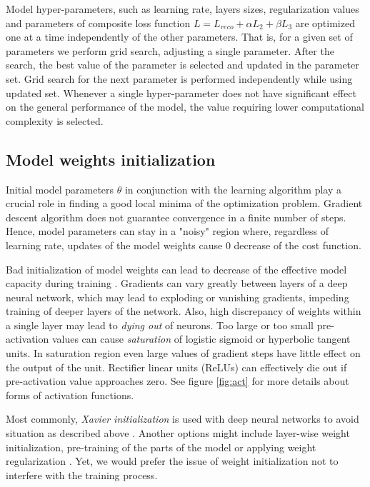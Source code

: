 Model hyper-parameters, such as learning rate, layers sizes, regularization values and parameters of composite loss function $L=L_{reco} + \alpha L_2 + \beta L_3$ are optimized one at a time independently of the other parameters.
That is, for a given set of parameters we perform grid search, adjusting a single parameter.
After the search, the best value of the parameter is selected and updated in the parameter set.
Grid search for the next parameter is performed independently while using updated set.
Whenever a single hyper-parameter does not have significant effect on the general performance of the model, the value requiring lower computational complexity is selected.

\subsection{Model weights initialization}

Initial model parameters $\theta$ in conjunction with the learning algorithm play a crucial role in finding a good local minima of the optimization problem.
Gradient descent algorithm does not guarantee convergence in a finite number of steps.
Hence, model parameters can stay in a "noisy" region where, regardless of learning rate, updates of the model weights cause 0 decrease of the cost function.

Bad initialization of model weights can lead to decrease of the effective model capacity during training \cite{Glorot2010}.
Gradients can vary greatly between layers of a deep neural network, which may lead to exploding or vanishing gradients, impeding training of deeper layers of the network.
Also, high discrepancy of weights within a single layer may lead to \textit{dying out} of neurons.
Too large or too small pre-activation values can cause \textit{saturation} of logistic sigmoid or hyperbolic tangent units. In saturation region even large values of gradient steps have little effect on the output of the unit.
Rectifier linear units (ReLUs) can effectively die out if pre-activation value approaches zero. See figure \ref{fig:act} for more details about forms of activation functions.

Most commonly, \textit{Xavier initialization} is used with deep neural networks to avoid situation as described above \cite{Glorot2010}.
Another options might include layer-wise weight initialization, pre-training of the parts of the model \cite{Simonyan2015} or applying weight regularization \cite{Good2016}.
Yet, we would prefer the issue of weight initialization not to interfere with the training process.

